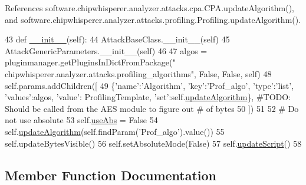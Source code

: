References software.\+chipwhisperer.\+analyzer.\+attacks.\+cpa.\+C\+P\+A.\+update\+Algorithm(), and software.\+chipwhisperer.\+analyzer.\+attacks.\+profiling.\+Profiling.\+update\+Algorithm().


\begin{DoxyCode}
43     \textcolor{keyword}{def }\hyperlink{classsoftware_1_1chipwhisperer_1_1analyzer_1_1attacks_1_1profiling_1_1Profiling_a19ddbad20e8662b4fc672b97f0ce1b9b}{\_\_init\_\_}(self):
44         AttackBaseClass.\_\_init\_\_(self)
45         AttackGenericParameters.\_\_init\_\_(self)
46 
47         algos = pluginmanager.getPluginsInDictFromPackage(\textcolor{stringliteral}{"
      chipwhisperer.analyzer.attacks.profiling\_algorithms"}, \textcolor{keyword}{False}, \textcolor{keyword}{False}, self)
48         self.params.addChildren([
49             \{\textcolor{stringliteral}{'name'}:\textcolor{stringliteral}{'Algorithm'}, \textcolor{stringliteral}{'key'}:\textcolor{stringliteral}{'Prof\_algo'}, \textcolor{stringliteral}{'type'}:\textcolor{stringliteral}{'list'}, \textcolor{stringliteral}{'values'}:algos, \textcolor{stringliteral}{'value'}:
      ProfilingTemplate, \textcolor{stringliteral}{'set'}:self.\hyperlink{classsoftware_1_1chipwhisperer_1_1analyzer_1_1attacks_1_1profiling_1_1Profiling_a752c7dfda87f7ca9c2af686953c3170b}{updateAlgorithm}\},            \textcolor{comment}{#TODO: Should be called from the AES module to
       figure out # of bytes}
50         ])
51 
52         \textcolor{comment}{# Do not use absolute}
53         self.\hyperlink{classsoftware_1_1chipwhisperer_1_1analyzer_1_1attacks_1_1profiling_1_1Profiling_a349d6c4d9e8d3044028da974bb747faf}{useAbs} = \textcolor{keyword}{False}
54         self.\hyperlink{classsoftware_1_1chipwhisperer_1_1analyzer_1_1attacks_1_1profiling_1_1Profiling_a752c7dfda87f7ca9c2af686953c3170b}{updateAlgorithm}(self.findParam(\textcolor{stringliteral}{'Prof\_algo'}).value())
55         self.updateBytesVisible()
56         self.setAbsoluteMode(\textcolor{keyword}{False})
57         self.\hyperlink{classsoftware_1_1chipwhisperer_1_1analyzer_1_1attacks_1_1profiling_1_1Profiling_a6ab79085111e40132ef81caec4cf4251}{updateScript}()
58 
\end{DoxyCode}


\subsection{Member Function Documentation}
\hypertarget{classsoftware_1_1chipwhisperer_1_1analyzer_1_1attacks_1_1profiling_1_1Profiling_a05523d24a79c50945db463f83fd3e4cc}{}
